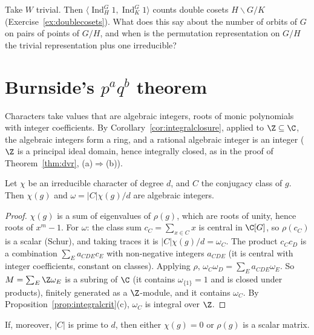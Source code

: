 \begin{think}
Take $W$ trivial. Then $\langle\operatorname{Ind}_H^G1,\operatorname{Ind}_K^G1\rangle$ counts double cosets $H\backslash G/K$ (Exercise~\ref{ex:doublecosets}). What does this say about the number of orbits of $G$ on pairs of points of $G/H$, and when is
the permutation representation on $G/H$ the trivial representation plus one irreducible?
\end{think}

\section{Burnside's \texorpdfstring{$p^aq^b$}{paqb} theorem}

Characters take values that are algebraic integers, roots of monic polynomials with integer coefficients. By Corollary~\ref{cor:integralclosure}, applied to $\Z\subseteq\C$, the algebraic integers form a ring, and
a rational algebraic integer is an integer ($\Z$ is a principal ideal domain, hence integrally closed, as in the proof of Theorem~\ref{thm:dvr}, (a)$\Rightarrow$(b)).

\begin{lemma}\label{lem:omega}
Let $\chi$ be an irreducible character of degree $d$, and $C$ the conjugacy class of $g$. Then $\chi(g)$ and $\omega=|C|\chi(g)/d$ are algebraic integers.
\end{lemma}

\begin{proof}
$\chi(g)$ is a sum of eigenvalues of $\rho(g)$, which are roots of unity, hence roots of $x^m-1$. For $\omega$: the class sum $c_C=\sum_{x\in C}x$ is central in $\C[G]$, so $\rho(c_C)$ is a scalar (Schur), and taking traces it is
$|C|\chi(g)/d=\omega_C$. The product $c_Cc_D$ is a combination $\sum_Ea_{CDE}c_E$ with non-negative integers $a_{CDE}$ (it is central with integer coefficients, constant on classes). Applying $\rho$, $\omega_C\omega_D=\sum_Ea_{CDE}\omega_E$. So $M=\sum_E\Z\omega_E$ is a subring of $\C$ (it contains $\omega_{\{1\}}=1$ and is closed under products), finitely generated as a $\Z$-module, and it contains $\omega_C$.
By Proposition~\ref{prop:integralcrit}(c), $\omega_C$ is integral over $\Z$.
\end{proof}

\begin{lemma}[Burnside]\label{lem:burnsidevanish}
If, moreover, $|C|$ is prime to $d$, then either $\chi(g)=0$ or $\rho(g)$ is a scalar matrix.
\end{lemma}

